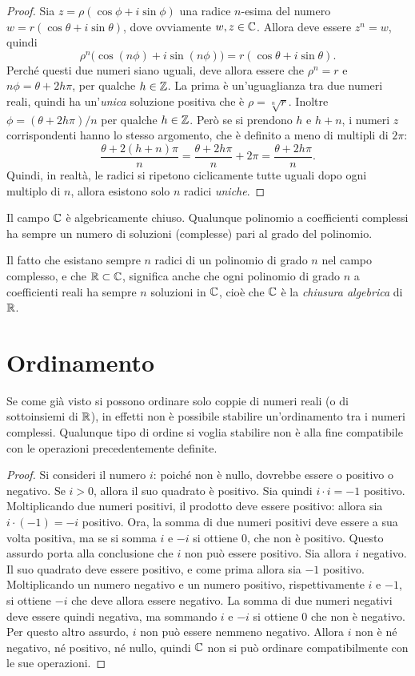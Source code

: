 \begin{proof}
Sia $z=\rho(\cos\phi+i\sin\phi)$ una radice $n$-esima del numero $w=r(\cos\theta+i\sin\theta)$, dove ovviamente $w,z\in\mathbb{C}$. Allora deve essere $z^n=w$, quindi
\[
\rho^n\big(\!\cos(n\phi)+i\sin(n\phi)\big)=r(\cos\theta+i\sin\theta).
\]
Perché questi due numeri siano uguali, deve allora essere che $\rho^n=r$ e $n\phi=\theta+2h\pi$, per qualche $h\in\mathbb{Z}$.
La prima è un'uguaglianza tra due numeri reali, quindi ha un'\emph{unica} soluzione positiva che è $\rho=\sqrt[n]{r}$. Inoltre $\phi=(\theta+2h\pi)/n$ per qualche $h\in\mathbb{Z}$.
Però se si prendono $h$ e $h+n$, i numeri $z$ corrispondenti hanno lo stesso argomento, che è definito a meno di multipli di $2\pi$:
\[
\frac{\theta+2(h+n)\pi}{n}=\frac{\theta+2h\pi}{n}+2\pi=\frac{\theta+2h\pi}{n}.
\]
Quindi, in realtà, le radici si ripetono ciclicamente tutte uguali dopo ogni multiplo di $n$, allora esistono solo $n$ radici \emph{uniche}.
\end{proof}
\begin{teorema}
Il campo $\mathbb{C}$ è algebricamente chiuso. Qualunque polinomio a coefficienti complessi ha sempre un numero di soluzioni (complesse) pari al grado del polinomio.
\end{teorema}
Il fatto che esistano sempre $n$ radici di un polinomio di grado $n$ nel campo complesso, e che $\mathbb{R}\subset\mathbb{C}$, significa anche che ogni polinomio di grado $n$ a coefficienti reali ha sempre $n$ soluzioni in $\mathbb{C}$, cioè che $\mathbb{C}$ è la \emph{chiusura algebrica} di $\mathbb{R}$.
\section{Ordinamento}
Se come già visto si possono ordinare solo coppie di numeri reali (o di sottoinsiemi di $\mathbb{R}$), in effetti non è possibile stabilire un'ordinamento tra i numeri complessi. Qualunque tipo di ordine si voglia stabilire non è alla fine compatibile con le operazioni precedentemente definite.
\begin{proof}
Si consideri il numero $i$: poiché non è nullo, dovrebbe essere o positivo o negativo. Se $i>0$, allora il suo quadrato è positivo. Sia quindi $i\cdot i=-1$ positivo. Moltiplicando due numeri positivi, il prodotto deve essere positivo: allora sia $i\cdot (-1)=-i$ positivo. Ora, la somma di due numeri positivi deve essere a sua volta positiva, ma se si somma $i$ e $-i$ si ottiene 0, che non è positivo. Questo assurdo porta alla conclusione che $i$ non può essere positivo.
Sia allora $i$ negativo. Il suo quadrato deve essere positivo, e come prima allora sia $-1$ positivo. Moltiplicando un numero negativo e un numero positivo, rispettivamente $i$ e $-1$, si ottiene $-i$ che deve allora essere negativo. La somma di due numeri negativi deve essere quindi negativa, ma sommando $i$ e $-i$ si ottiene 0 che non è negativo. Per questo altro assurdo, $i$ non può essere nemmeno negativo.
Allora $i$ non è né negativo, né positivo, né nullo, quindi $\mathbb{C}$ non si può ordinare compatibilmente con le sue operazioni.
\end{proof}
